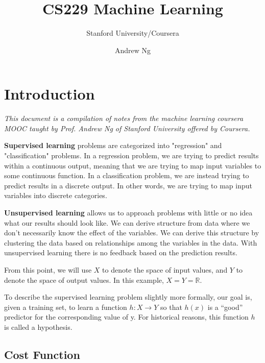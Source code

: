 \documentclass{article}
\title{CS229 Machine Learning}
\author{Stanford University/Coursera}
\date{Andrew Ng}
\begin{document}
    \begin{titlingpage}
        \maketitle
    \end{titlingpage}

    \newpage

    \section{Introduction}

        \textit{This document is a compilation of notes from the machine learning coursera MOOC taught by Prof. Andrew Ng of Stanford University
        offered by Coursera.}
        \par
        \textbf{Supervised learning} problems are categorized into "regression" and "classification" problems. In a regression problem, 
        we are trying to predict results within a continuous output, meaning that we are trying to map input variables to some 
        continuous function. In a classification problem, we are instead trying to predict results in a discrete output. In other words, 
        we are trying to map input variables into discrete categories.
        \par
        \textbf{Unsupervised learning} allows us to approach problems with little or no idea what our results should look like. 
        We can derive structure from data where we don't necessarily know the effect of the variables.
        We can derive this structure by clustering the data based on relationships among the variables in the data.
        With unsupervised learning there is no feedback based on the prediction results.
        \par
        From this point, we will use $X$ to denote the space of input values, and $Y$ to denote the space of output values. In this example, $X = Y = \mathbb{R}$.
        \par
        To describe the supervised learning problem slightly more formally, our goal is, given a training set, 
        to learn a function $h : X \longrightarrow Y$ so that $h(x)$ is a “good” predictor for the corresponding value of y. For historical reasons, this 
        function $h$ is called a hypothesis. 
        
        \subsection{Cost Function}
            
\end{document}
